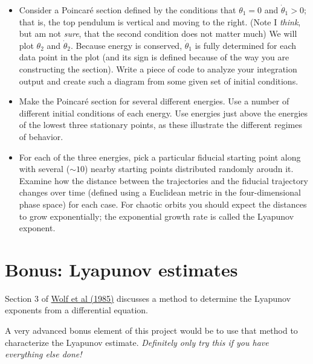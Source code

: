 \documentclass[11pt, preprint]{aastex}
\begin{document}
\begin{itemize}
\item Consider a Poincar{\'e} section defined by the conditions that
  $\theta_1=0$ and $\dot\theta_1>0$; that is, the top pendulum is
  vertical and moving to the right.  (Note I {\it think}, but am not
  {\it sure}, that the second condition does not matter much) We will
  plot $\theta_2$ and $\dot\theta_2$. Because energy is conserved,
  $\dot\theta_1$ is fully determined for each data point in the plot
  (and its sign is defined because of the way you are constructing the
  section). Write a piece of code to analyze your
  integration output and create such a diagram from some given set of
  initial conditions.
 \item Make the Poincar{\'e} section for several different
   energies. Use a number of different initial conditions of each
   energy. Use energies just above the energies of the lowest three
   stationary points, as these illustrate the different regimes of
   behavior.
\item For each of the three energies, pick a particular fiducial
  starting point along with several ($\sim 10$) nearby starting points
  distributed randomly aroudn it. Examine how the distance between the
  trajectories and the fiducial trajectory changes over time (defined
  using a Euclidean metric in the four-dimensional phase space) for
  each case. For chaotic orbits you should expect the distances to
  grow exponentially; the exponential growth rate is called the
  Lyapunov exponent.
\end{itemize}

\section{Bonus: Lyapunov estimates}

Section 3 of
\href{https://www.sciencedirect.com/science/article/pii/0167278985900119}{Wolf
  et al (1985)} discusses a method to determine the Lyapunov exponents
from a differential equation.

A very advanced bonus element of this project would be to use that
method to characterize the Lyapunov estimate. {\it Definitely only try
  this if you have everything else done!}
\end{document}
